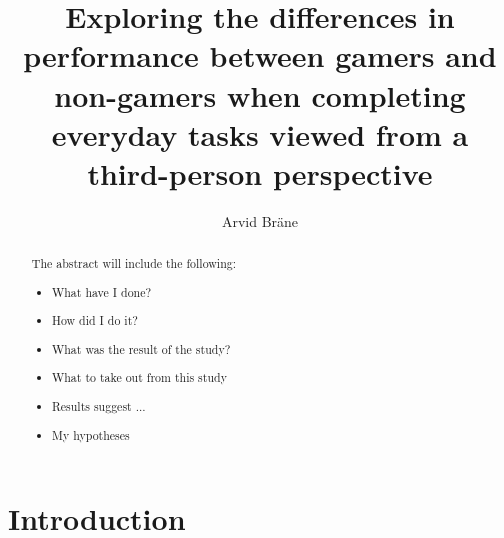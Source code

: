 \documentclass[runningheads,a4paper,oribibl]{llncs}
\begin{document}
\pagestyle{headings}

\mainmatter

\title{Exploring the differences in performance between gamers and non-gamers when completing everyday tasks viewed from a third-person perspective}



\author{Arvid Bräne}


\maketitle


\begin{abstract}
	

The abstract will include the following:
\begin{itemize}
	\item What have I done?
	\item How did I do it?
	\item What was the result of the study?
	\item What to take out from this study
	\item Results suggest ...
	\item My hypotheses 
\end{itemize}

\end{abstract}











\section{Introduction}
\end{document}

